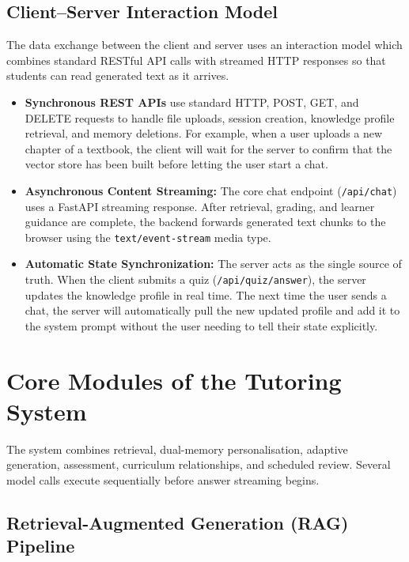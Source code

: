 \documentclass[11pt, a4paper, oneside]{report}
\begin{document}
\subsection{Client--Server Interaction Model}

The data exchange between the client and server uses an interaction model which combines
standard RESTful API calls with streamed HTTP responses so that students can read generated text as it arrives.

\begin{itemize}[leftmargin=2em, itemsep=4pt]
  \item \textbf{Synchronous REST APIs} use standard HTTP, POST, GET, and DELETE
        requests to handle file uploads, session creation, knowledge profile retrieval, and
        memory deletions. For example, when a user uploads a new chapter of a textbook,
        the client will wait for the server to confirm that the vector store has been built
        before letting the user start a chat.

  \item \textbf{Asynchronous Content Streaming:} The core chat endpoint
        (\texttt{/api/chat}) uses a FastAPI streaming response. After retrieval, grading, and learner guidance are complete, the backend forwards generated text chunks to the browser using the
        \texttt{text/event-stream} media type.

  \item \textbf{Automatic State Synchronization:} The server acts as the single source
        of truth. When the client submits a quiz (\texttt{/api/quiz/answer}), the server
        updates the knowledge profile in real time. The next time the user sends a chat, the
        server will automatically pull the new updated profile and add it to the system
        prompt without the user needing to tell their state explicitly.
\end{itemize}

\section{Core Modules of the Tutoring System}

The system combines retrieval, dual-memory personalisation, adaptive generation, assessment, curriculum relationships, and scheduled review. Several model calls execute sequentially before answer streaming begins.

\subsection{Retrieval-Augmented Generation (RAG) Pipeline}
\end{document}
